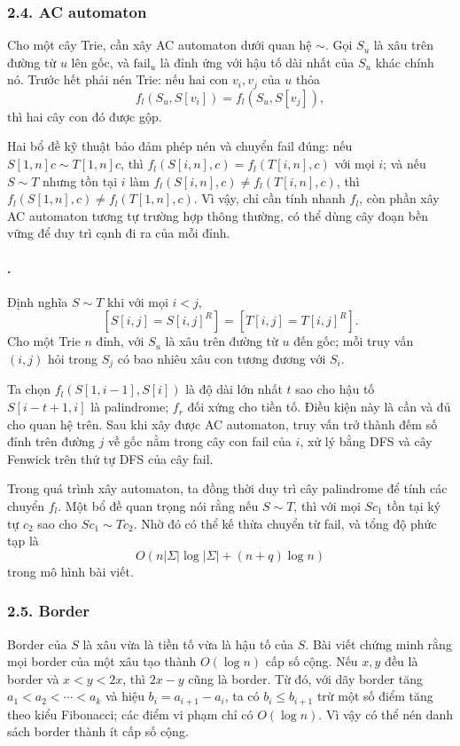 \documentclass[11pt]{article}
\begin{document}
\subsubsection*{2.4. AC automaton}

Cho một cây Trie, cần xây AC automaton dưới quan hệ \(\sim\). Gọi \(S_u\) là
xâu trên đường từ \(u\) lên gốc, và \(\mathrm{fail}_u\) là đỉnh ứng với hậu tố
dài nhất của \(S_u\) khác chính nó. Trước hết phải nén Trie: nếu hai con
\(v_i,v_j\) của \(u\) thỏa
\[
  f_l(S_u,S[v_i])=f_l(S_u,S[v_j]),
\]
thì hai cây con đó được gộp.

Hai bổ đề kỹ thuật bảo đảm phép nén và chuyển fail đúng: nếu \(S[1,n]c\sim
T[1,n]c\), thì \(f_l(S[i,n],c)=f_l(T[i,n],c)\) với mọi \(i\); và nếu
\(S\sim T\) nhưng tồn tại \(i\) làm \(f_l(S[i,n],c)\ne f_l(T[i,n],c)\), thì
\(f_l(S[1,n],c)\ne f_l(T[1,n],c)\). Vì vậy, chỉ cần tính nhanh \(f_l\), còn
phần xây AC automaton tương tự trường hợp thông thường, có thể dùng cây đoạn
bền vững để duy trì cạnh đi ra của mỗi đỉnh.

\paragraph{.}
Định nghĩa \(S\sim T\) khi với mọi \(i<j\),
\[
  [S[i,j]=S[i,j]^R]=[T[i,j]=T[i,j]^R].
\]
Cho một Trie \(n\) đỉnh, với \(S_u\) là xâu trên đường từ \(u\) đến gốc; mỗi
truy vấn \((i,j)\) hỏi trong \(S_j\) có bao nhiêu xâu con tương đương với
\(S_i\).

Ta chọn \(f_l(S[1,i-1],S[i])\) là độ dài lớn nhất \(t\) sao cho hậu tố
\(S[i-t+1,i]\) là palindrome; \(f_r\) đối xứng cho tiền tố. Điều kiện này là
cần và đủ cho quan hệ trên. Sau khi xây được AC automaton, truy vấn trở thành
đếm số đỉnh trên đường \(j\) về gốc nằm trong cây con fail của \(i\), xử lý
bằng DFS và cây Fenwick trên thứ tự DFS của cây fail.

Trong quá trình xây automaton, ta đồng thời duy trì cây palindrome để tính các
chuyển \(f_l\). Một bổ đề quan trọng nói rằng nếu \(S\sim T\), thì với mọi
\(Sc_1\) tồn tại ký tự \(c_2\) sao cho \(Sc_1\sim Tc_2\). Nhờ đó có thể kế thừa
chuyển từ fail, và tổng độ phức tạp là
\[
  O(n|\Sigma|\log|\Sigma|+(n+q)\log n)
\]
trong mô hình bài viết.

\subsubsection*{2.5. Border}

Border của \(S\) là xâu vừa là tiền tố vừa là hậu tố của \(S\). Bài viết chứng
minh rằng mọi border của một xâu tạo thành \(O(\log n)\) cấp số cộng. Nếu
\(x,y\) đều là border và \(x<y<2x\), thì \(2x-y\) cũng là border. Từ đó, với
dãy border tăng \(a_1<a_2<\cdots<a_k\) và hiệu \(b_i=a_{i+1}-a_i\), ta có
\(b_i\le b_{i+1}\) trừ một số điểm tăng theo kiểu Fibonacci; các điểm vi phạm
chỉ có \(O(\log n)\). Vì vậy có thể nén danh sách border thành ít cấp số cộng.
\end{document}
